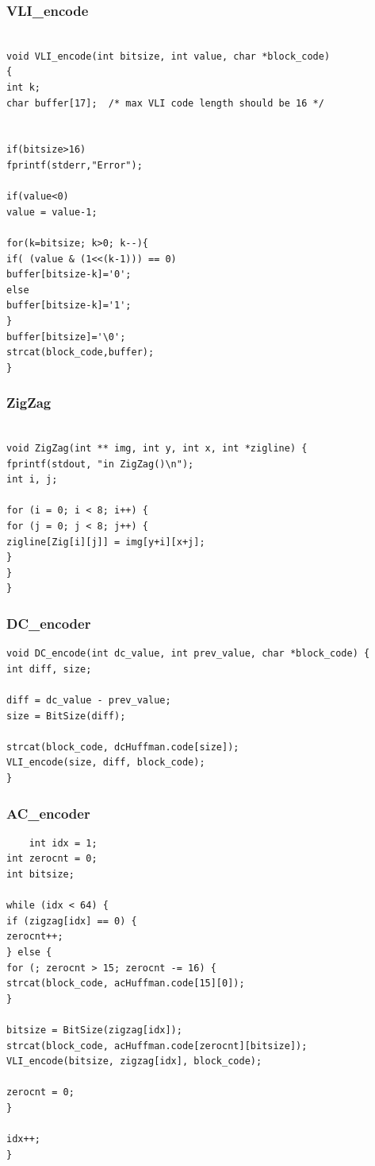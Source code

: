 \documentclass[paper=a4, fontsize=11pt]{scrartcl} %
\numberwithin{equation}{section} %
\numberwithin{figure}{section} %
\numberwithin{table}{section} %
\begin{document}
\subsubsection{VLI\_encode}
\begin{lstlisting}[frame=single]

void VLI_encode(int bitsize, int value, char *block_code)
{
int k;
char buffer[17];  /* max VLI code length should be 16 */


if(bitsize>16)
fprintf(stderr,"Error");

if(value<0)
value = value-1;  

for(k=bitsize; k>0; k--){
if( (value & (1<<(k-1))) == 0)  
buffer[bitsize-k]='0';
else
buffer[bitsize-k]='1'; 
}
buffer[bitsize]='\0';  
strcat(block_code,buffer);
}  
\end{lstlisting}
\subsubsection{ZigZag}
\begin{lstlisting}[frame=single]

void ZigZag(int ** img, int y, int x, int *zigline) {
fprintf(stdout, "in ZigZag()\n");
int i, j;

for (i = 0; i < 8; i++) {
for (j = 0; j < 8; j++) {
zigline[Zig[i][j]] = img[y+i][x+j];
}
}
}
\end{lstlisting}

\subsubsection{DC\_encoder}
\begin{lstlisting}
void DC_encode(int dc_value, int prev_value, char *block_code) {
int diff, size;

diff = dc_value - prev_value;
size = BitSize(diff);

strcat(block_code, dcHuffman.code[size]);
VLI_encode(size, diff, block_code);
}
\end{lstlisting}
\subsubsection{AC\_encoder}
\begin{lstlisting}
	int idx = 1;
int zerocnt = 0;
int bitsize;

while (idx < 64) {
if (zigzag[idx] == 0) {
zerocnt++;
} else {
for (; zerocnt > 15; zerocnt -= 16) {
strcat(block_code, acHuffman.code[15][0]);
}

bitsize = BitSize(zigzag[idx]);
strcat(block_code, acHuffman.code[zerocnt][bitsize]);
VLI_encode(bitsize, zigzag[idx], block_code);

zerocnt = 0;
}

idx++;
}
\end{lstlisting}
\end{document}
